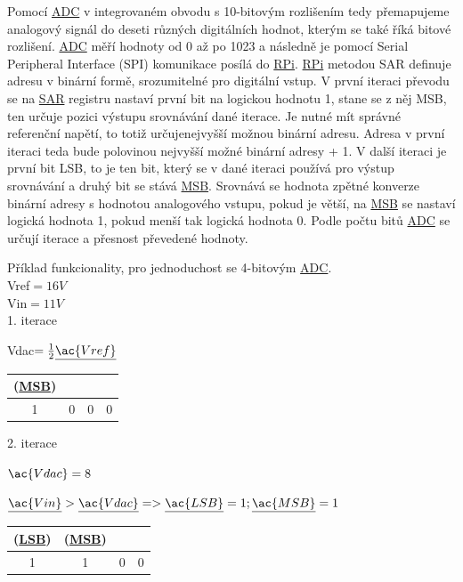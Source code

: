 \documentclass[czech,12pt,a4paper]{article}
\begin{document}
Pomocí \underline{\ac{ADC}} v integrovaném obvodu s 10-bitovým rozlišením tedy přemapujeme analogový signál do deseti různých digitálních hodnot, kterým se také říká bitové rozlišení. \underline{\ac{ADC}} měří hodnoty od 0 až po 1023 a následně je pomocí Serial Peripheral Interface (SPI) komunikace posílá do \underline{\ac{RPi}}. \underline{\ac{RPi}} metodou \ac{SAR} definuje adresu v binární formě, srozumitelné pro digitální vstup. V první iteraci převodu se na \underline{\ac{SAR}} registru nastaví první bit na logickou hodnotu 1, stane se z něj \ac{MSB}, ten určuje pozici výstupu srovnávání dané iterace. Je nutné mít správné referenční napětí, to totiž určuje\linebreak nejvyšší možnou binární adresu. Adresa v první iteraci teda bude polovinou nejvyšší možné binární adresy + 1. V další iteraci je první bit \ac{LSB}, to je ten bit, který se v dané iteraci používá pro výstup srovnávání a druhý bit se stává \underline{\ac{MSB}}. Srovnává se hodnota zpětné konverze binární adresy s hodnotou analogového vstupu, pokud je větší, na \underline{\ac{MSB}} se nastaví logická hodnota 1, pokud menší tak logická hodnota 0. Podle počtu bitů \underline{\ac{ADC}} se určují iterace a přesnost převedené hodnoty.

\vspace*{1cm}
\noindent Příklad funkcionality, pro jednoduchost se 4-bitovým \underline{\ac{ADC}}. \\

\noindent\ac{Vref}$ = 16V$ \\
\noindent\ac{Vin}$ = 11V$ \\

1. iterace

\ac{Vdac}$ = \frac{1}{2} \underline{\ac{Vref}}$

\begin{center}
	\begin{tabular}{ |c|c|c|c| } 
		\hline
		(\underline{\ac{MSB}}) & & & \\ 
		\hline
		1 & 0 & 0 & 0 \\ 
		\hline
	\end{tabular}
\end{center}

2. iterace

	$\ac{Vdac} = 8$

	$\underline{\ac{Vin}} > \underline{\ac{Vdac}} => \underline{\ac{LSB}} = 1; \underline{\ac{MSB}} = 1$

\begin{center}
	\begin{tabular}{ |c|c|c|c| } 
		\hline
		(\underline{\ac{LSB}}) & (\underline{\ac{MSB}}) & & \\ 
		\hline
		1 & 1 & 0 & 0 \\ 
		\hline
	\end{tabular}
\end{center}
\end{document}
